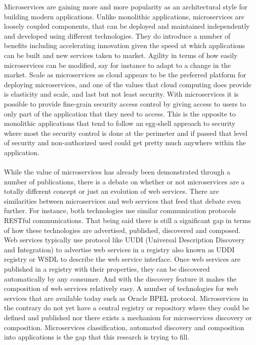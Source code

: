 \documentclass{article}
\begin{document}
Microservices are gaining more and more popularity as an architectural style for building modern applications. Unlike monolithic applications, microservices are loosely coupled components, that can be deployed and maintained independently and developed using different technologies. They do introduce a number of benefits including accelerating innovation given the speed at which applications can be built and new services taken to market. Agility in terms of how easily microservices can be modified, say for instance to adapt to a change in the market. Scale as microservices as cloud appears to be the preferred platform for deploying microservices, and one of the values that cloud computing does provide is elasticity and scale, and last but not least security. With microservices it is possible to provide fine-grain security access control by giving access to users to only part of the application that they need to access.  This is the opposite to monolithic applications that tend to follow an egg-shell approach to security where most the security control is done at the perimeter and if passed that level of security and non-authorized used could get pretty much anywhere within the application. 
\\
\\
While the value of microservices has already been demonstrated through a number of publications, there is a debate on whether or not microservices are a totally different concept or just an evolution of web services. There are similarities between microservices and web services that feed that debate even further. For instance, both technologies use similar communication protocols RESTful communications. That being said there is still a significant gap in terms of how these technologies are advertised, published, discovered and composed. Web services typically use protocol like UUDI (Universal Description Discovery and Integration) to advertise web services in a registry also known as UDDI registry or WSDL to describe the web service interface. Once web services are published in a registry with their properties, they can be discovered automatically by any consumer. And with the discovery feature it makes the composition of web services relatively easy. A number of technologies for web services that are available today such as Oracle BPEL protocol. Microservices in the contrary do not yet have a central registry or repository where they could be defined and published nor there exists a mechanism for microservices discovery or composition. Microservices classification, automated discovery and composition into applications is the gap that this research is trying to fill.
\end{document}
